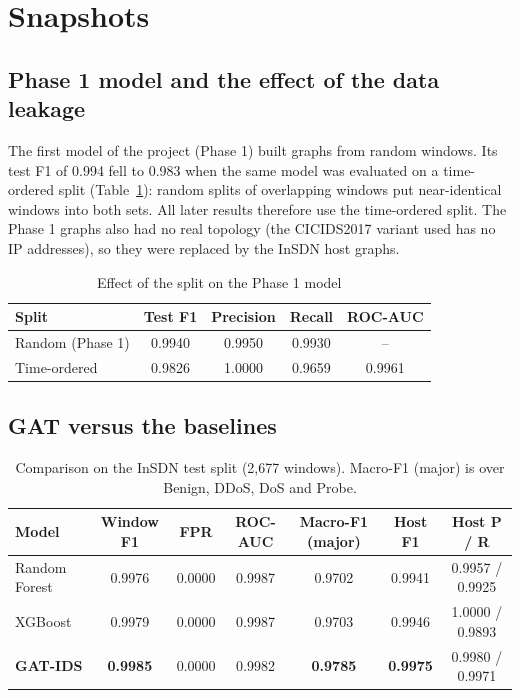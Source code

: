 \section{Snapshots}

\subsection{Phase 1 model and the effect of the data leakage}

The first model of the project (Phase 1) built graphs from random windows. Its test F1 of 0.994 fell to 0.983 when the same model was evaluated on a time-ordered split (Table~\ref{tab:leak}): random splits of overlapping windows put near-identical windows into both sets. All later results therefore use the time-ordered split. The Phase 1 graphs also had no real topology (the CICIDS2017 variant used has no IP addresses), so they were replaced by the InSDN host graphs.

\begin{table}[htbp]
\centering
\caption{Effect of the split on the Phase 1 model}
\label{tab:leak}
\begin{tabular}{|l|c|c|c|c|}
\hline
\textbf{Split} & \textbf{Test F1} & \textbf{Precision} & \textbf{Recall} & \textbf{ROC-AUC} \\ \hline
Random (Phase 1) & 0.9940 & 0.9950 & 0.9930 & -- \\ \hline
Time-ordered & 0.9826 & 1.0000 & 0.9659 & 0.9961 \\ \hline
\end{tabular}
\end{table}

\subsection{GAT versus the baselines}

\begin{table}[htbp]
\centering
\caption{Comparison on the InSDN test split (2,677 windows). Macro-F1 (major) is over Benign, DDoS, DoS and Probe.}
\label{tab:main}
\small
\begin{tabular}{|l|c|c|c|c|c|c|}
\hline
\textbf{Model} & \textbf{Window F1} & \textbf{FPR} & \textbf{ROC-AUC} & \textbf{Macro-F1 (major)} & \textbf{Host F1} & \textbf{Host P / R} \\ \hline
Random Forest & 0.9976 & 0.0000 & 0.9987 & 0.9702 & 0.9941 & 0.9957 / 0.9925 \\ \hline
XGBoost & 0.9979 & 0.0000 & 0.9987 & 0.9703 & 0.9946 & 1.0000 / 0.9893 \\ \hline
\textbf{GAT-IDS} & \textbf{0.9985} & 0.0000 & 0.9982 & \textbf{0.9785} & \textbf{0.9975} & 0.9980 / 0.9971 \\ \hline
\end{tabular}
\end{table}

